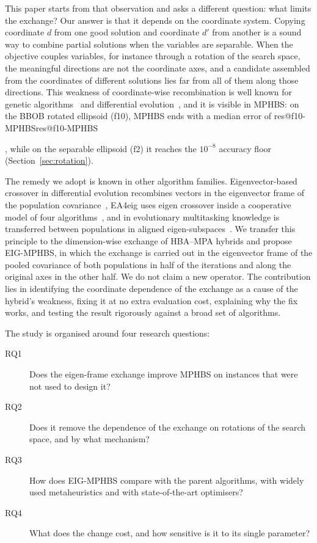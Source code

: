 \documentclass[preprint,12pt,authoryear]{elsarticle}
\makeatletter
\theoremstyle{remark}
\def\res#1{\ifcsname res@#1\endcsname\csname res@#1\endcsname\else\PackageError{res}{Undefined result key #1}{}\fi}
\makeatother
\begin{document}
This paper starts from that observation and asks a different question: what limits the exchange? Our answer is that
it depends on the coordinate system. Copying coordinate $d$ from one good solution and coordinate $d'$ from another is
a sound way to combine partial solutions when the variables are separable. When the objective couples variables, for
instance through a rotation of the search space, the meaningful directions are not the coordinate axes, and a candidate
assembled from the coordinates of different solutions lies far from all of them along those directions. This weakness
of coordinate-wise recombination is well known for genetic algorithms~\citep{salomon1996rotation} and differential
evolution~\citep{guo2015eigen}, and it is visible in MPHBS: on the BBOB rotated ellipsoid (f10), MPHBS ends with a
median error of \res{f10-MPHBS}, while on the separable ellipsoid (f2) it reaches the $10^{-8}$ accuracy floor
(Section~\ref{sec:rotation}).

The remedy we adopt is known in other algorithm families. Eigenvector-based crossover in differential evolution
recombines vectors in the eigenvector frame of the population covariance~\citep{guo2015eigen,wang2014cobide}, EA4eig
uses eigen crossover inside a cooperative model of four algorithms~\citep{bujok2022ea4eig}, and in evolutionary
multitasking knowledge is transferred between populations in aligned eigen-subspaces~\citep{tang2021regularized,
tang2022adaptive}. We transfer this principle to the dimension-wise exchange of HBA--MPA hybrids and propose EIG-MPHBS,
in which the exchange is carried out in the eigenvector frame of the pooled covariance of both populations in half of
the iterations and along the original axes in the other half. We do not claim a new operator. The contribution lies in
identifying the coordinate dependence of the exchange as a cause of the hybrid's weakness, fixing it at no extra
evaluation cost, explaining why the fix works, and testing the result rigorously against a broad set of algorithms.

The study is organised around four research questions:
\begin{description}
\item[RQ1] Does the eigen-frame exchange improve MPHBS on instances that were not used to design it?
\item[RQ2] Does it remove the dependence of the exchange on rotations of the search space, and by what mechanism?
\item[RQ3] How does EIG-MPHBS compare with the parent algorithms, with widely used metaheuristics and with
state-of-the-art optimisers?
\item[RQ4] What does the change cost, and how sensitive is it to its single parameter?
\end{description}
\end{document}
